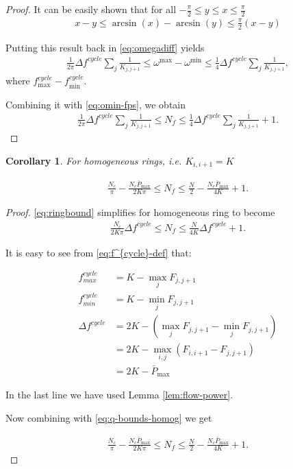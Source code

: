 \documentclass[10pt,aps,pra,onecolumn,superscriptaddress]{revtex4-1}
\newtheorem{corr}{Corollary}
\begin{document}
\begin{proof}
It can be easily shown that for all $-\frac{\pi}{2}\leq y \leq x \leq \frac{\pi}{2}$
\begin{align}
\label{}
x-y\leq \arcsin(x)-\arcsin(y)\leq \frac{\pi}{2}(x-y)
\end{align}

Putting this result back in \eqref{eq:omegadiff} yields
\begin{align}
\label{eq:domega-bounds}
\frac{1}{2\pi}\Delta f^{cycle} \sum_{j}\frac{1}{K_{j,j+1}} \leq \omega^{\max}-\omega^{\min}\leq \frac{1}{4}\Delta f^{cycle} \sum_{j}\frac{1}{K_{j,j+1}} ,
\end{align}
where $f^{cycle}_{\max}-f^{cycle}_{\min}$.  


Combining it with \eqref{eq:omin-fps}, we obtain
\begin{align}
\label{eq:ringbound}
\frac{1}{2\pi}\Delta f^{cycle} \sum_{j}\frac{1}{K_{j,j+1}} \leq N_{f} \leq \frac{1}{4}\Delta f^{cycle} \sum_{j}\frac{1}{K_{j,j+1}}+1.
\end{align}
\end{proof}


\begin{corr}
For homogeneous rings, i.e.   $K_{i,i+1}=K$

\begin{align}
\label{}
\frac{N_c}{\pi}-\frac{N_c\bar{P}_{\max}}{2K\pi} \leq N_{f} \leq \frac{N}{2} - \frac{N_c\bar{P}_{\max}}{4K}+1.
\end{align}
\end{corr}

\begin{proof}
\eqref{eq:ringbound} simplifies for homogeneous ring to become
\begin{align}
\label{eq:q-bounds-homog}
\frac{N_c}{2K\pi}\Delta f^{cycle} \leq N_{f} \leq \frac{N}{4K}\Delta f^{cycle}+1.
\end{align}

It is easy to see from \eqref{eq:f^{cycle}-def} that:

\begin{align}
\label{}
f^{cycle}_{max}&=K-\max_{j}F_{j,j+1}\\
f^{cycle}_{min}&=K-\min_{j}F_{j,j+1}\\
\Delta f^{cycle} &= 2K-\left(\max_{j}F_{j,j+1}-\min_{j}F_{j,j+1} \right)\\
&=2K-\max_{i,j}\left(F_{i,i+1} - F_{j,j+1} \right)\\
&=2K-\bar{P}_{\max}
\end{align}

In the last line we have used Lemma \ref{lem:flow-power}.

Now combining with \eqref{eq:q-bounds-homog} we get

\begin{align}
\label{eq:nf-boun-homog}
\frac{N_c}{\pi}-\frac{N_c\bar{P}_{\max}}{2K\pi} \leq N_{f} \leq \frac{N}{2} - \frac{N_c\bar{P}_{\max}}{4K}+1.
\end{align}
\end{proof}
\end{document}
